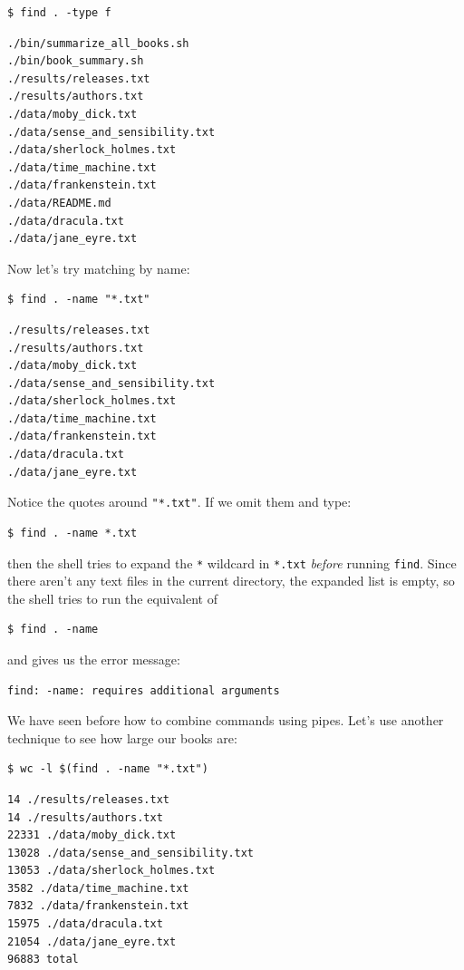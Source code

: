 \documentclass[
]{krantz}
\begin{document}
\begin{verbatim}
$ find . -type f
\end{verbatim}

\begin{verbatim}
./bin/summarize_all_books.sh
./bin/book_summary.sh
./results/releases.txt
./results/authors.txt
./data/moby_dick.txt
./data/sense_and_sensibility.txt
./data/sherlock_holmes.txt
./data/time_machine.txt
./data/frankenstein.txt
./data/README.md
./data/dracula.txt
./data/jane_eyre.txt
\end{verbatim}

Now let's try matching by name:

\begin{verbatim}
$ find . -name "*.txt"
\end{verbatim}

\begin{verbatim}
./results/releases.txt
./results/authors.txt
./data/moby_dick.txt
./data/sense_and_sensibility.txt
./data/sherlock_holmes.txt
./data/time_machine.txt
./data/frankenstein.txt
./data/dracula.txt
./data/jane_eyre.txt
\end{verbatim}

Notice the quotes around \texttt{"*.txt"}.
If we omit them and type:

\begin{verbatim}
$ find . -name *.txt
\end{verbatim}

then the shell tries to expand the \texttt{*} wildcard in \texttt{*.txt}
\emph{before} running \texttt{find}.
Since there aren't any text files in the current directory,
the expanded list is empty,
so the shell tries to run the equivalent of

\begin{verbatim}
$ find . -name
\end{verbatim}

and gives us the error message:

\begin{verbatim}
find: -name: requires additional arguments
\end{verbatim}

We have seen before how to combine commands using pipes.
Let's use another technique to see how large our books are:

\begin{verbatim}
$ wc -l $(find . -name "*.txt")
\end{verbatim}

\begin{verbatim}
14 ./results/releases.txt
14 ./results/authors.txt
22331 ./data/moby_dick.txt
13028 ./data/sense_and_sensibility.txt
13053 ./data/sherlock_holmes.txt
3582 ./data/time_machine.txt
7832 ./data/frankenstein.txt
15975 ./data/dracula.txt
21054 ./data/jane_eyre.txt
96883 total
\end{verbatim}
\end{document}
